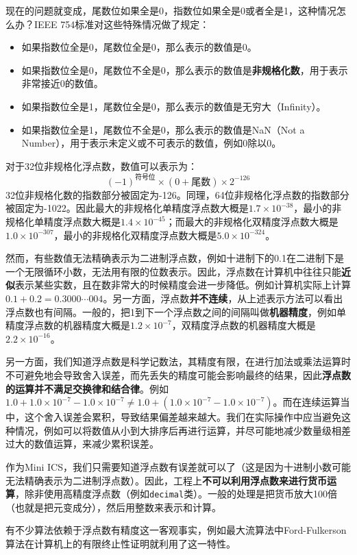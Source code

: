 现在的问题就变成，尾数位如果全是0，指数位如果全是0或者全是1，这种情况怎么办？IEEE 754标准对这些特殊情况做了规定：
\begin{itemize}
  \item 如果指数位全是0，尾数位全是0，那么表示的数值是0。
  \item 如果指数位全是0，尾数位不全是0，那么表示的数值是\textbf{非规格化数}，用于表示非常接近0的数值。
  \item 如果指数位全是1，尾数位全是0，那么表示的数值是无穷大（Infinity）。
  \item 如果指数位全是1，尾数位不全是0，那么表示的数值是NaN（Not a Number），用于表示未定义或不可表示的数值，例如0除以0。
\end{itemize}
对于32位非规格化浮点数，数值可以表示为：
$$(-1)^{\text{符号位}} \times (0 + \text{尾数}) \times 2^{-126}$$
32位非规格化数的指数部分被固定为-126。同理，64位非规格化浮点数的指数部分被固定为-1022。因此最大的非规格化单精度浮点数大概是$1.7 \times 10^{-38}$，最小的非规格化单精度浮点数大概是$1.4 \times 10^{-45}$；而最大的非规格化双精度浮点数大概是$1.0 \times 10^{-307}$，最小的非规格化双精度浮点数大概是$5.0 \times 10^{-324}$。

然而，有些数值无法精确表示为二进制浮点数，例如十进制下的0.1在二进制下是一个无限循环小数，无法用有限的位数表示。因此，浮点数在计算机中往往只能\textbf{近似}表示某些实数，且在数非常大的时候精度会进一步降低。例如计算机实际上计算$0.1+0.2=0.3000\cdots 004$。另一方面，浮点数\textbf{并不连续}，从上述表示方法可以看出浮点数也有间隔。一般的，把1到下一个浮点数之间的间隔叫做\textbf{机器精度}，例如单精度浮点数的机器精度大概是$1.2 \times 10^{-7}$，双精度浮点数的机器精度大概是$2.2 \times 10^{-16}$。

另一方面，我们知道浮点数是科学记数法，其精度有限，在进行加法或乘法运算时不可避免地会导致舍入误差，而先丢失的精度可能会影响最终的结果，因此\textbf{浮点数的运算并不满足交换律和结合律}。例如$1.0 + 1.0 \times 10^{-7} - 1.0 \times 10^{-7} \neq 1.0 + (1.0 \times 10^{-7} - 1.0 \times 10^{-7})$。而在连续运算当中，这个舍入误差会累积，导致结果偏差越来越大。我们在实际操作中应当避免这种情况，例如可以将数值从小到大排序后再进行运算，并尽可能地减少数量级相差过大的数值运算，来减少累积误差。

作为Mini ICS，我们只需要知道浮点数有误差就可以了（这是因为十进制小数可能无法精确表示为二进制浮点数）。因此，工程上\textbf{不可以利用浮点数来进行货币运算}，除非使用高精度浮点数（例如\texttt{decimal}类）。一般的处理是把货币放大100倍（也就是把元变成分），然后用整数来表示和计算。

有不少算法依赖于浮点数有精度这一客观事实，例如最大流算法中Ford-Fulkerson算法在计算机上的有限终止性证明就利用了这一特性。

